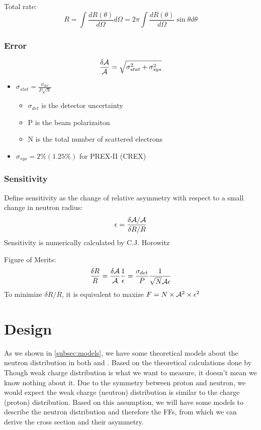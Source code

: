 Total rate:
\begin{equation}
    R = \int \frac{dR(\theta)}{d\Omega} d\Omega 
      = 2\pi \int \frac{dR(\theta)}{d\Omega} \sin\theta d\theta
\end{equation}

\subsubsection{Error}
\begin{equation}
    \frac{\delta \mathcal{A}}{\mathcal{A}} = \sqrt{\sigma^2_{stat} + \sigma^2_{sys}}
\end{equation}
\begin{itemize}
    \item $\sigma_{stat} = \frac{\sigma_{det}}{P\sqrt{N}}$ 
	\begin{itemize}
	    \item $\sigma_{det}$ is the detector uncertainty
	    \item P is the beam polarizaiton
	    \item N is the total number of scattered electrons
	\end{itemize}
    \item $\sigma_{sys} = 2\% (1.25\%)$ for PREX-II (CREX)
\end{itemize}

\subsubsection{Sensitivity}
Define sensitivity as the change of relative asymmetry with respect to a small
change in neutron radius:
\begin{equation}
    \epsilon = \frac{\delta \mathcal{A}/\mathcal{A}}{\delta R/R}
\end{equation}
Sensitivity is numerically calculated by  C.J. Horowitz \cite{PhysRevC.57.3430}

Figure of Merits:
\begin{equation}
    \frac{\delta R}{R} = \frac{\delta \mathcal{A}}{\mathcal{A}} \frac{1}{\epsilon} 
	= \frac{\sigma_{det}}{P} \frac{1}{\sqrt{N} \mathcal{A} \epsilon}
\end{equation}
To minimize $\delta R/R$, it is equivalent to maxize $F = N\times \mathcal{A}^2 \times \epsilon^2$

\section{Design}
As we shown in \ref{subsec:models}, we have some theoretical models about the
neutron distribution in both \Pb and \Ca. Based on the theoretical calculations
done by 
Though weak charge distribution is what we want to measure, it doesn't mean we
know nothing about it. Due to the symmetry between proton and neutron, we would
expect the weak charge (neutron) distribution is similar to the charge (proton)
distribution. Based on this assumption, we will have some models to describe
the neutron distribution and therefore the FFs, from which we can derive the
cross section and their asymmetry.

